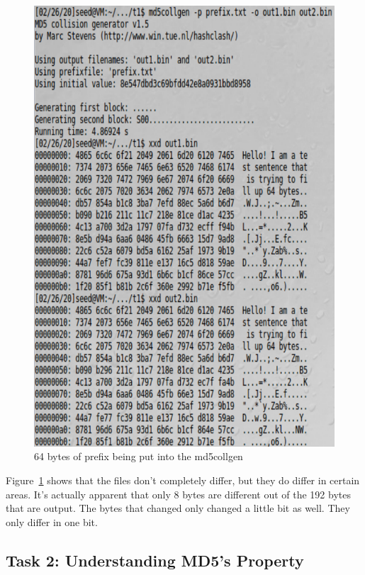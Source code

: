 \documentclass[12pt]{article}
\begin{document}
\begin{figure}[H]
	\begin{center}
		\includegraphics[scale=0.65]{pics/t1p1.png}
	\end{center}{}
	\caption{64 bytes of prefix being put into the md5collgen}
	\label{fig:t1p1}
\end{figure}

Figure~\ref{fig:t1p1} shows that the files don't completely differ, but they do differ in certain areas. It's actually apparent that only 8 bytes are different out of the 192 bytes that are output. The bytes that changed only changed a little bit as well. They only differ in one bit.


\subsection{Task 2: Understanding MD5's Property}
\end{document}

